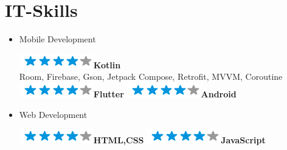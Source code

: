 \documentclass[]{friggeri-cv}
\begin{document}
\section{IT-Skills}
        \vspace*{-0.45cm}
        \setlength{\columnsep}{-0.3cm}
        \begin{flushleft}
        \begin{multicols}{3}
		\begin{itemize}
		
		\setlength{\itemsep}{5pt}
  		\setlength{\parskip}{0pt}
  		\setlength{\parsep}{0pt}
          
        
\item \large Mobile Development \
\normalsize
\begin{flushleft}

\includegraphics[scale=0.40]{res/img/4stars.png}\hspace{1.5mm}\textbf{Kotlin}\\Room, Firebase, Gson, Jetpack Compose, Retrofit, MVVM, Coroutine\\\vspace{2mm}
\includegraphics[scale=0.40]{res/img/4stars.png}\hspace{1.5mm}\textbf{Flutter}
\includegraphics[scale=0.40]{res/img/4stars.png}\hspace{1.5mm}\textbf{Android}
\end{flushleft}            

\item \large Web Development \
\normalsize
\begin{flushleft}

\includegraphics[scale=0.40]{res/img/4stars.png}\hspace{1.5mm}\textbf{HTML,CSS}
\includegraphics[scale=0.40]{res/img/4stars.png}\hspace{1.5mm}\textbf{JavaScript}
\end{flushleft}            


\end{itemize}
\end{multicols}
\end{flushleft}
\end{document}
